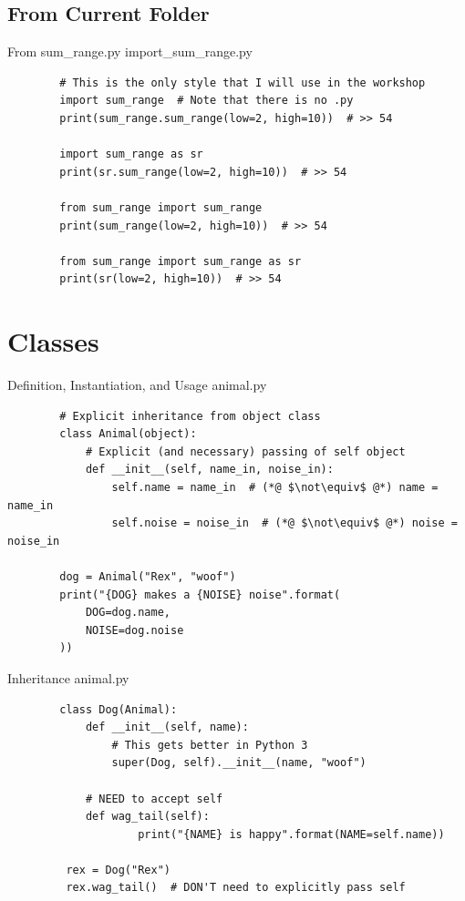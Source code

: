 \documentclass[11pt]{beamer}
\begin{document}
\subsection{From Current Folder}
\begin{frame}[fragile]{From sum\_range.py}
	import\_sum\_range.py
	\begin{lstlisting}
		# This is the only style that I will use in the workshop
		import sum_range  # Note that there is no .py
		print(sum_range.sum_range(low=2, high=10))  # >> 54
		
		import sum_range as sr
		print(sr.sum_range(low=2, high=10))  # >> 54
		
		from sum_range import sum_range
		print(sum_range(low=2, high=10))  # >> 54
		
		from sum_range import sum_range as sr
		print(sr(low=2, high=10))  # >> 54
	\end{lstlisting}
\end{frame}

\section{Classes}
\begin{frame}[fragile]{Definition, Instantiation, and Usage}
	animal.py
	\begin{lstlisting}
		# Explicit inheritance from object class
		class Animal(object):
		    # Explicit (and necessary) passing of self object
		    def __init__(self, name_in, noise_in):
		        self.name = name_in  # (*@ $\not\equiv$ @*) name = name_in
		        self.noise = noise_in  # (*@ $\not\equiv$ @*) noise = noise_in
		
		dog = Animal("Rex", "woof")
		print("{DOG} makes a {NOISE} noise".format(
		    DOG=dog.name,
		    NOISE=dog.noise
		))
	\end{lstlisting}
\end{frame}

\begin{frame}[fragile]{Inheritance}
	animal.py
	\begin{lstlisting}
		class Dog(Animal):
		    def __init__(self, name):
		        # This gets better in Python 3
		        super(Dog, self).__init__(name, "woof")
		    
		    # NEED to accept self
		    def wag_tail(self):
		    	    print("{NAME} is happy".format(NAME=self.name))
		 
		 rex = Dog("Rex")
		 rex.wag_tail()  # DON'T need to explicitly pass self
	\end{lstlisting}
\end{frame}
\end{document}
